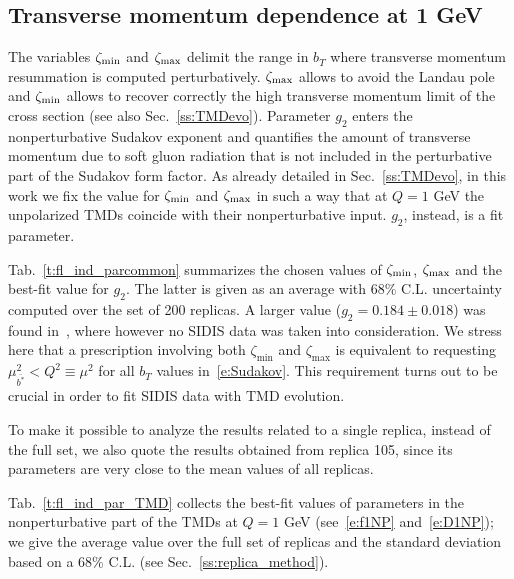 \documentclass[aps,preprintnumbers,showpacs,nofootinbib,superscriptaddress,floatfix]{revtex4}
\newcommand{\bb}{\zeta}
\begin{document}
\subsection{Transverse momentum dependence at 1 GeV}
\label{ss:bestfit_TMDs}

The variables $\bb_{\rm min}$ and $\bb_{\rm max}$ delimit the range in $b_T$ where transverse momentum resummation is computed perturbatively. $\bb_{\rm max}$ allows to avoid the Landau pole and $\bb_{\rm min}$ allows to recover correctly the high transverse momentum limit of the cross section (see also Sec.~\ref{ss:TMDevo}).
Parameter $g_2$ enters the nonperturbative Sudakov exponent and
quantifies the amount of transverse momentum 
due to soft gluon radiation that is not included in the
perturbative part of the Sudakov form factor.
As already detailed in Sec.~\ref{ss:TMDevo}, in this work we fix the value for
$\bb_{\rm min}$ and $\bb_{\rm max}$ in such a way that at $Q=1$ GeV the
unpolarized TMDs coincide with their nonperturbative input. $g_2$, instead, is
a fit parameter. 

Tab.~\ref{t:fl_ind_parcommon} summarizes the chosen values of $\bb_{\rm min}$,
$\bb_{\rm max}$ and the best-fit value for $g_2$. The latter is given as an
average with $68\%$ C.L. uncertainty computed over the set of 200 replicas. A
larger value ($g_2 = 0.184 \pm 0.018$) was found in~\cite{Konychev:2005iy},
where however no SIDIS data was taken into consideration.
We stress here that a prescription involving both $\bb_{\text{min}}$ and
$\bb_{\text{max}}$ is equivalent to requesting $\mu_{\bar{b^*}}^2 < Q^2 \equiv
\mu^2$ for all $b_T$ values in~\eqref{e:Sudakov}. This requirement turns out
to be crucial in order to fit SIDIS data with TMD evolution.

To make it possible to analyze the results related to a single replica,
instead of the full set, we also quote the results obtained from
replica 105, since its parameters are very close to the
mean values of all replicas. 

Tab.~\ref{t:fl_ind_par_TMD} collects the best-fit values of parameters in the nonperturbative part of the TMDs at $Q=1$ GeV (see~\eqref{e:f1NP} and~\eqref{e:D1NP}); we give the average value over the full set of replicas and the standard deviation based on a $68\%$ C.L. (see Sec.~\ref{ss:replica_method}). 
\end{document}
